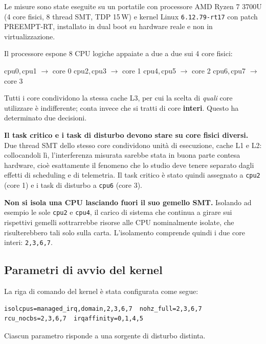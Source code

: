 Le misure sono state eseguite su un portatile con processore AMD Ryzen 7 3700U (4 core fisici,
8 thread SMT, TDP 15\,W) e kernel Linux \texttt{6.12.79-rt17} con patch PREEMPT-RT, installato
in dual boot su hardware reale e non in virtualizzazione.

Il processore espone 8 CPU logiche appaiate a due a due sui 4 core fisici:

\begin{center}\ttfamily\small
cpu0,\,cpu1 $\rightarrow$ core 0 \quad
cpu2,\,cpu3 $\rightarrow$ core 1 \quad
cpu4,\,cpu5 $\rightarrow$ core 2 \quad
cpu6,\,cpu7 $\rightarrow$ core 3
\end{center}

Tutti i core condividono la stessa cache L3, per cui la scelta di \emph{quali} core utilizzare \`e
indifferente; conta invece che si tratti di core \textbf{interi}. Questo ha determinato due
decisioni.

\textbf{Il task critico e i task di disturbo devono stare su core fisici diversi.} Due thread SMT
dello stesso core condividono unit\`a di esecuzione, cache L1 e L2: collocandoli l\`i,
l'interferenza misurata sarebbe stata in buona parte contesa hardware, cio\`e esattamente il
fenomeno che lo studio deve tenere separato dagli effetti di scheduling e di telemetria. Il task
critico \`e stato quindi assegnato a \texttt{cpu2} (core 1) e i task di disturbo a \texttt{cpu6}
(core 3).

\textbf{Non si isola una CPU lasciando fuori il suo gemello SMT.} Isolando ad esempio le sole
\texttt{cpu2} e \texttt{cpu4}, il carico di sistema che continua a girare sui rispettivi gemelli
sottrarrebbe risorse alle CPU nominalmente isolate, che risulterebbero tali solo sulla carta.
L'isolamento comprende quindi i due core interi: \texttt{2,3,6,7}.

\subsection{Parametri di avvio del kernel}

La riga di comando del kernel \`e stata configurata come segue:

\begin{lstlisting}
isolcpus=managed_irq,domain,2,3,6,7  nohz_full=2,3,6,7
rcu_nocbs=2,3,6,7  irqaffinity=0,1,4,5
\end{lstlisting}

Ciascun parametro risponde a una sorgente di disturbo distinta.


